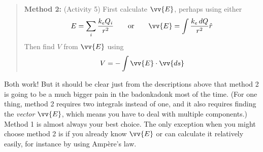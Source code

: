 \begin{quote}
\textbf{Method 2:} (Activity 5) First calculate $\vv{E}$, perhaps using either
$$E = \sum_i{\frac{k_e Q_i}{r^2}}
\qquad  \mathrm{or} \qquad 
\vv{E} = \int{\frac{k_e \, dQ}{r^2}\hat{r}}$$
Then find $V$ from $\vv{E}$ using
$$V = - \int{\vv{E} \cdot \vv{ds}}$$
\end{quote}

Both work!  But it should be clear just from the descriptions above that method 2 is going to be a much bigger pain in the badonkadonk most of the time.  (For one thing, method 2 requires two integrals instead of one, and it also requires finding the \textit{vector} $\vv{E}$, which means you have to deal with multiple components.)  Method 1 is almost always your best choice.  The only exception when you might choose method 2 is if you already know $\vv{E}$ or can calculate it relatively easily, for instance by using Amp\`ere's law.


